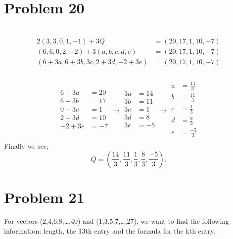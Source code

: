 \documentclass{article}
\begin{document}
\section{Problem 20}
\\
\begin{equation*}
\begin{split}
2(3,3,0,1,-1) + 3Q &= (20,17,1,10,-7)\\
(6,6,0,2,-2) + 3(a,b,c,d,e) &= (20,17,1,10,-7)\\
(6+3a,6+3b,3c,2+3d,-2+3e) &= (20,17,1,10,-7)\\
\end{split}
\end{equation*}
\\
\begin{equation*}
\begin{split}
6 + 3a &= 20\\
6 + 3b &= 17\\
0 + 3c &= 1\\
2 + 3d &= 10\\
-2 + 3e &= -7\\
\end{split}
\xrightarrow{}
\begin{split}
3a &= 14\\
3b &= 11\\
3c &= 1\\
3d &= 8\\
3e &= -5\\
\end{split}
\xrightarrow{}
\begin{split}
a &= \frac{14}{3}\\
b &= \frac{11}{3}\\
c &= \frac{1}{3}\\
d &= \frac{8}{3}\\
e &= \frac{-5}{3}\\
\end{split}
\end{equation*}
Finally we see,\\
\begin{equation*}
Q = \left(\frac{14}{3},\frac{11}{3},\frac{1}{3},\frac{8}{3},\frac{-5}{3}\right).
\end{equation*}

\newpage
\section{Problem 21}
For vectors (2,4,6,8,\ldots,40) and (1,3,5,7,\ldots,27), we want to find the
following information: length, the 13th entry and the formula for the kth
entry.
\end{document}
